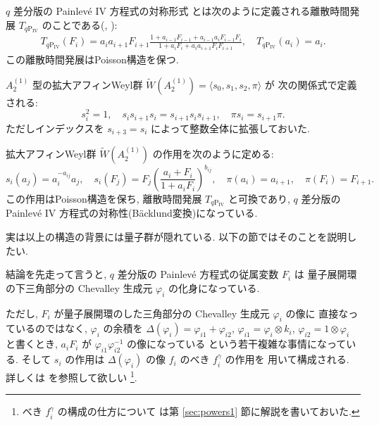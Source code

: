 \documentclass[12pt,twoside,dvipdfm]{msjproc}
\theoremstyle{definition} %
\theoremstyle{definition} %
\theoremstyle{definition} %
\numberwithin{theorem}{section}
\numberwithin{equation}{section}
\numberwithin{figure}{section}
\numberwithin{table}{section}
\newcommand\secref[1]{第 \ref{#1} 節}
\newcommand\qP[1]{{\text{$q\mathrm{P}_{\text{#1}}$}}}
\newcommand\bra{\langle}
\newcommand\ket{\rangle}
\newcommand\WW{\widetilde{W}}
\begin{document}
$q$ 差分版の Painlev\'e IV 方程式の対称形式 \qP{IV} 
とは次のように定義される離散時間発展 $T_\qP{IV}$ のことである(\cite{KNY-qPIV}, \cite{Noumi-AWG}):
\begin{align*}
  T_\qP{IV}(F_i) = 
  a_i a_{i+1} F_{i+1}
  \frac{1+a_{i-1}F_{i-1}+a_{i-1}a_i F_{i-1}F_i}{1+a_i F_i+a_i a_{i+1} F_i F_{i+1}},
  \quad
  T_\qP{IV}(a_i) = a_i.
\end{align*}
この離散時間発展はPoisson構造を保つ.

$A^{(1)}_2$ 型の拡大アフィンWeyl群 $\WW(A^{(1)}_2)=\bra s_0,s_1,s_2,\pi\ket$ が
次の関係式で定義される:
\begin{equation*}
 s_i^2=1, \quad
 s_is_{i+1}s_i=s_{i+1}s_is_{i+1}, \quad
 \pi s_i = s_{i+1} \pi.
\end{equation*}
ただしインデックスを $s_{i+3}=s_i$ によって整数全体に拡張しておいた.

拡大アフィンWeyl群 $\WW(A^{(1)}_2)$ の作用を次のように定める:
\begin{equation*}
  s_i(a_j) = a_i^{-{a_{ij}}}a_j,  \quad 
  s_i(F_j) = F_j \left(\frac{a_i+F_i}{1+a_i F_i}\right)^{b_{ij}}, \quad
  \pi(a_i)=a_{i+1}, \quad
  \pi(F_i)=F_{i+1}.
\end{equation*}
この作用はPoisson構造を保ち, 離散時間発展 $T_{\qP{IV}}$ と可換であり, 
$q$ 差分版の Painlev\'e IV 方程式の対称性(B\"acklund変換)になっている.

実は以上の構造の背景には量子群が隠れている.
以下の節ではそのことを説明したい.

結論を先走って言うと, $q$ 差分版の Painlev\'e 方程式の従属変数 $F_i$ は
量子展開環の下三角部分の Chevalley 生成元 $\varphi_i$ の化身になっている.

ただし,  $F_i$ が量子展開環のした三角部分の Chevalley 生成元 $\varphi_i$ の像に
直接なっているのではなく, 
$\varphi_i$ の余積を $\Delta(\varphi_i)=\varphi_{i1}+\varphi_{i2}$, 
$\varphi_{i1}=\varphi_i\otimes k_i$, $\varphi_{i2}=1\otimes\varphi_i$ 
と書くとき,  $a_i F_i$ が $\varphi_{i1}\varphi_{i2}^{-1}$ の像になっている
という若干複雑な事情になっている.
そして $s_i$ の作用は $\Delta(\varphi_i)$ の像 $f_i$ のべき $f_i^\gamma$ の作用を
用いて構成される.   詳しくは \cite{Kuroki-W} を参照して欲しい%
\footnote{べき $f_i^\gamma$ の構成の仕方について
は\secref{sec:powers1}に解説を書いておいた.}. 
\end{document}
